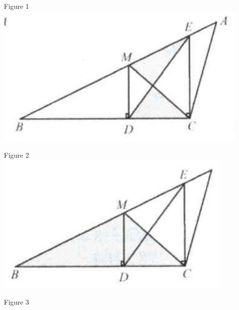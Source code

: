 \documentclass{article}
\begin{document}
Figure 1\\
\centering
\includegraphics[width=\textwidth]{images/018.jpg}

Figure 2\\
\centering
\includegraphics[width=\textwidth]{images/018(1).jpg}

Figure 3
\end{document}
